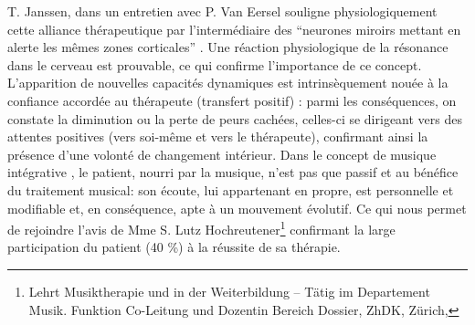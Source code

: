 \begin{itemize}
 T. Janssen, dans un entretien
 avec P. Van Eersel
 souligne physiologiquement cette alliance thérapeutique
 par l'intermédiaire des ``{neurones
 	miroirs mettant en alerte les mêmes zones corticales}'' \autocite[203]{van_eersel_cerveau}.
 Une réaction physiologique de la résonance dans le cerveau est prouvable, ce qui confirme l'importance 
 de ce concept. 
  \newline 
  L'apparition de nouvelles
 	capacités  dynamiques est intrinsèquement nouée à la confiance
 accordée au thérapeute (transfert positif)
 \autocite{roustang1986} : parmi les conséquences, on constate la
 diminution ou la perte de peurs cachées, celles-ci se dirigeant vers des
 attentes positives (vers soi-même et vers le thérapeute), confirmant ainsi la
 présence d'une volonté de changement intérieur.
 Dans le concept de musique intégrative \autocite{vrait_musicotherapie_2018},  le patient, nourri par
la musique, n'est pas que passif et
au bénéfice  du traitement musical: son écoute, lui
appartenant en propre, est personnelle et modifiable %
et, en conséquence, apte à un mouvement évolutif.
Ce qui nous permet de rejoindre l'avis de Mme S. Lutz
Hochreutener\footnote{Lehrt Musiktherapie und in der Weiterbildung – Tätig
	im Departement Musik. Funktion Co-Leitung und Dozentin Bereich
	Dossier, ZhDK, Zürich, %
}
confirmant la large participation du patient (40 \%) à la réussite de sa thérapie.


  
  \end{itemize}




